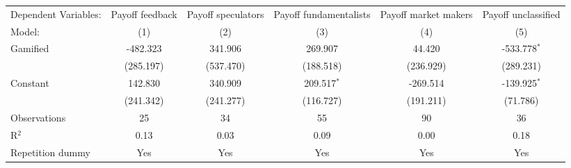 \begin{tabular}{lccccc}
   \tabularnewline \midrule \midrule
   Dependent Variables: & Payoff feedback & Payoff speculators & Payoff fundamentalists & Payoff market makers & Payoff unclassified\\  
   Model:               & (1)             & (2)                & (3)                    & (4)                  & (5)\\  
   \midrule
   Gamified             & -482.323        & 341.906            & 269.907                & 44.420               & -533.778$^{*}$\\   
                        & (285.197)       & (537.470)          & (188.518)              & (236.929)            & (289.231)\\   
   Constant             & 142.830         & 340.909            & 209.517$^{*}$          & -269.514             & -139.925$^{*}$\\   
                        & (241.342)       & (241.277)          & (116.727)              & (191.211)            & (71.786)\\   
   \midrule
   Observations         & 25              & 34                 & 55                     & 90                   & 36\\  
   R$^2$                & 0.13            & 0.03               & 0.09                   & 0.00                 & 0.18\\  
   Repetition dummy     & Yes             & Yes                & Yes                    & Yes                  & Yes\\  
   \midrule \midrule
\end{tabular}
